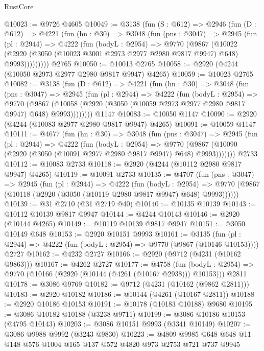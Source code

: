 \begin{lexlean}{RustCore}
\begin{coremodule}
@10023 := @9726 @4605
@10049 := @3138
    (fun (S : @612) =>
    @2946
      (fun (D : @612) =>
      @4221
        (fun (hn : @30) =>
        @3048
          (fun (pns : @3047) =>
          @2945
            (fun (pl : @2944) =>
            @4222
              (fun (bodyL : @2954) =>
              @9770
                (@9867
                  (@10022
                    (@2920 (@3050 (@10023 @3001 @2973 @2977 @2980 @9817 @9947) @648) @9993)))))))))
    @2765
@10050 := @10013 @2765
@10058 := @2920 (@4244 (@10050 @2973 @2977 @2980 @9817 @9947) @4265)
@10059 := @10023 @2765
@10082 := @3138
    (fun (D : @612) =>
    @4221
      (fun (hn : @30) =>
      @3048
        (fun (pns : @3047) =>
        @2945
          (fun (pl : @2944) =>
          @4222
            (fun (bodyL : @2954) =>
            @9770
              (@9867
                (@10058 (@2920 (@3050 (@10059 @2973 @2977 @2980 @9817 @9947) @648) @9993))))))))
    @1147
@10083 := @10050 @1147
@10090 := @2920 (@4244 (@10083 @2977 @2980 @9817 @9947) @4265)
@10091 := @10059 @1147
@10111 := @4677
    (fun (hn : @30) =>
    @3048
      (fun (pns : @3047) =>
      @2945
        (fun (pl : @2944) =>
        @4222
          (fun (bodyL : @2954) =>
          @9770 (@9867 (@10090 (@2920 (@3050 (@10091 @2977 @2980 @9817 @9947) @648) @9993)))))))
    @2733
@10112 := @10083 @2733
@10118 := @2920 (@4244 (@10112 @2980 @9817 @9947) @4265)
@10119 := @10091 @2733
@10135 := @4707
    (fun (pns : @3047) =>
    @2945
      (fun (pl : @2944) =>
      @4222
        (fun (bodyL : @2954) =>
        @9770 (@9867 (@10118 (@2920 (@3050 (@10119 @2980 @9817 @9947) @648) @9993))))))
@10139 := @31 @2710 (@31 @2719 @40)
@10140 := @10135 @10139
@10143 := @10112 @10139 @9817 @9947
@10144 := @4244 @10143
@10146 := @2920 (@10144 @4265)
@10149 := @10119 @10139 @9817 @9947
@10151 := @3050 @10149 @648
@10153 := @2920 @10151 @9993
@10161 := @3135
    (fun (pl : @2944) => @4222 (fun (bodyL : @2954) => @9770 (@9867 (@10146 @10153))))
    @2727
@10162 := @4232 @2727
@10166 := @2920 (@9712 (@4231 (@10162 @9863)))
@10167 := @4262 @2727
@10177 := @4758
    (fun (bodyL : @2954) => @9770 (@10166 (@2920 (@10144 (@4261 (@10167 @2938))) @10153)))
    @2811
@10178 := @3086 @9769
@10182 := @9712 (@4231 (@10162 (@9862 @2811)))
@10183 := @2920 @10182
@10186 := @10144 (@4261 (@10167 @2811))
@10188 := @2920 @10186 @10153
@10191 := @10178 (@10183 @10188) @9680
@10195 := @3086 @10182 @10188 (@3238 @9711)
@10199 := @3086 @10186 @10153 (@4795 @10143)
@10203 := @3086 @10151 @9993 (@3341 @10149)
@10207 := @3086 @9988 @9992 (@3243 @9830)
@10223 := @4809 @9985 @648 @648 @11 @148 @576 @1004 @165 @137 @572 @4820 @973 @2753 @721 @737 @9945

\end{coremodule}
\end{lexlean}
